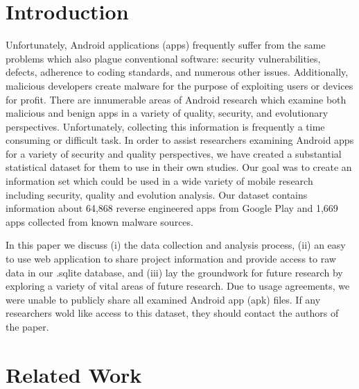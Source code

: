 \documentclass{sig-alternate-05-2015}
\begin{document}
\section{Introduction}

Unfortunately, Android applications (apps) frequently suffer from the same problems which also plague conventional software: security vulnerabilities, defects, adherence to coding standards, and numerous other issues. Additionally, malicious developers create malware for the purpose of exploiting users or devices for profit. There are innumerable areas of Android research which examine both malicious and benign apps in a variety of quality, security, and evolutionary perspectives. Unfortunately, collecting this information is frequently a time consuming or difficult task. In order to assist researchers examining Android apps for a variety of security and quality perspectives, we have created a substantial statistical dataset for them to use in their own studies. Our goal was to create an information set which could be used in a wide variety of mobile research including security, quality and evolution analysis. Our dataset contains information about 64,868 reverse engineered apps from Google Play and 1,669 apps collected from known malware sources.

In this paper we discuss (i) the data collection and analysis process, (ii) an easy to use web application to share project information and provide access to raw data in our .sqlite database, and (iii) lay the groundwork for future research by exploring a variety of vital areas of future research. Due to usage agreements, we were unable to publicly share all examined Android app (apk) files. If any researchers wold like access to this dataset, they should contact the authors of the paper.


\section{Related Work}
\label{sec: relatedworks}
\end{document}
